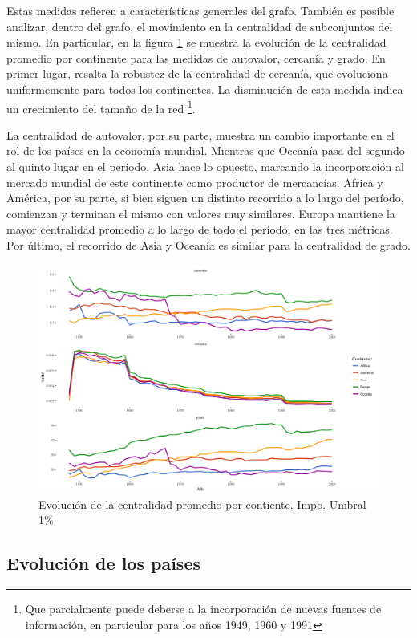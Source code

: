 \documentclass[a4paper]{article}
\begin{document}
Estas medidas refieren a características generales del grafo. También es posible analizar, dentro del grafo, el movimiento en la centralidad de subconjuntos del mismo. En particular, en la figura  \ref{fig:centralidad_LP} se muestra la evolución de la centralidad promedio por continente para las medidas de autovalor, cercanía y grado. En primer lugar, resalta la robustez de la centralidad de cercanía, que evoluciona uniformemente para todos los continentes. La disminución de esta medida indica un crecimiento del tamaño de la red \footnote{ Que parcialmente puede deberse a la incorporación de nuevas fuentes de información, en particular para los años 1949, 1960 y 1991}. \par
La centralidad de autovalor, por su parte, muestra un cambio importante en el rol de los países en la economía mundial. Mientras que Oceanía pasa del segundo al quinto lugar en el período, Asia hace lo opuesto, marcando la incorporación al mercado mundial de este continente como productor de mercancías.  Africa y América, por su parte, si bien siguen un distinto recorrido a lo largo del período, comienzan y terminan el mismo con valores muy similares. Europa mantiene la mayor centralidad promedio a lo largo de todo el período, en las tres métricas. Por último, el recorrido de Asia y Oceanía es similar para la centralidad de grado.

\begin{figure}[h!]
	\centering		\includegraphics[width=\linewidth]{1950_2000_continent_all}
	\caption{Evolución de la centralidad promedio por contiente. Impo. Umbral 1\%}
	\label{fig:centralidad_LP}
\end{figure}

\subsection{Evolución de los países}
\end{document}
